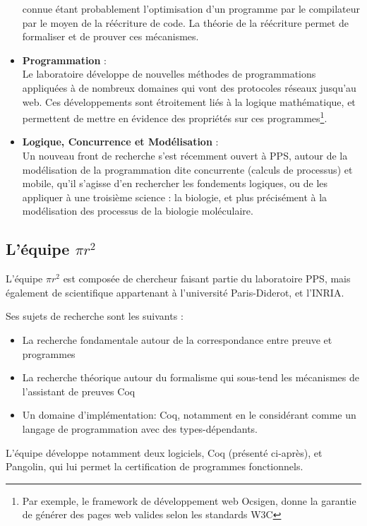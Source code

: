 \documentclass[a4paper, 11pt]{report}
\newcommand{\pir}[0]{\textbf{$\pi r^2$}\xspace}
\begin{document}
\begin{itemize}
          connue étant probablement l'optimisation d'un programme par le
          compilateur par le moyen de la réécriture de code.
          La théorie de la réécriture permet de formaliser et de prouver ces
          mécanismes.
        \item \textbf{Programmation} : \\
          Le laboratoire développe de nouvelles méthodes de programmations
          appliquées à de nombreux domaines qui vont des protocoles réseaux
          jusqu'au web. Ces développements sont étroitement liés à la
          logique mathématique, et permettent de mettre en évidence des
          propriétés sur ces programmes\footnote{Par exemple, le framework de
          développement web Ocsigen, donne la garantie de générer des pages
          web valides selon les standards W3C}.
        \item \textbf{Logique, Concurrence et Modélisation} : \\
          Un nouveau front de recherche s'est récemment ouvert à PPS, autour
          de la modélisation de la programmation dite concurrente (calculs de
          processus) et mobile, qu'il s'agisse d'en rechercher les fondements
          logiques, ou de les appliquer à une troisième science : la
          biologie, et plus précisément à la modélisation des processus de
          la biologie moléculaire.
      \end{itemize}

      \subsection{L'équipe \pir}
      L'équipe \pir{} est composée de chercheur faisant partie du laboratoire
      PPS, mais également de scientifique appartenant à l'université
      Paris-Diderot, et l'INRIA.

      Ses sujets de recherche sont les suivants :
      \begin{itemize}
        \item La recherche fondamentale autour de la correspondance entre preuve et programmes
        \item La recherche théorique autour du formalisme qui sous-tend les
          mécanismes de l'assistant de preuves Coq
        \item Un domaine d'implémentation: Coq, notamment en le considérant comme
          un langage de programmation avec des types-dépendants.
      \end{itemize}
      L'équipe développe notamment deux logiciels, Coq (présenté ci-après),
      et Pangolin, qui lui permet la certification de programmes fonctionnels.
\end{document}
